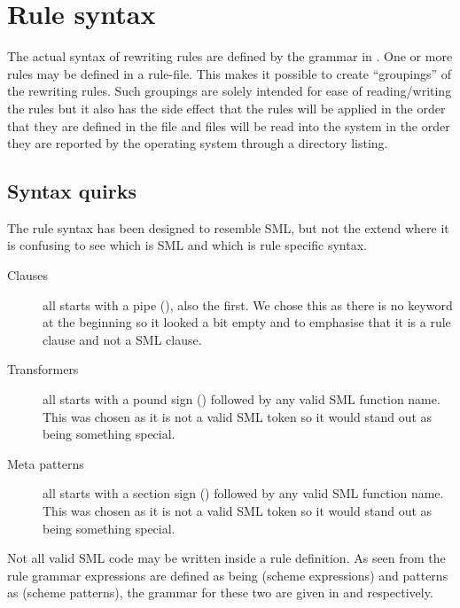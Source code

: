 \section{Rule syntax}
\label{sec:rule-syntax}
The actual syntax of rewriting rules are defined by the grammar in
. One or more rules may be defined in a rule-file. This
makes it possible to create ``groupings'' of the rewriting rules. Such groupings
are solely intended for ease of reading/writing the rules but it also has the
side effect that the rules will be applied in the order that they are defined in
the file and files will be read into the system in the order they are reported
by the operating system through a directory listing.

\subsection{Syntax quirks}

The rule syntax has been designed to resemble SML, but not the extend where it
is confusing to see which is SML and which is rule specific syntax.

\begin{description}
\item[Clauses] all starts with a pipe (\ttt{|}), also the first. We chose this as
  there is no  keyword at the beginning so it looked a bit empty and to
  emphasise that it is a rule clause and not a SML clause.

\item[Transformers] all starts with a pound sign () followed by any valid
  SML function name. This was chosen as it is not a valid SML token so it would
  stand out as being something special.

\item[Meta patterns] all starts with a section sign () followed by any
  valid SML function name. This was chosen as it is not a valid SML token so it
  would stand out as being something special.
\end{description}

Not all valid SML code may be written inside a rule definition. As seen from the
rule grammar expressions are defined as being  (scheme expressions)
and patterns as  (scheme patterns), the grammar for these two are
given in  and 
respectively.






